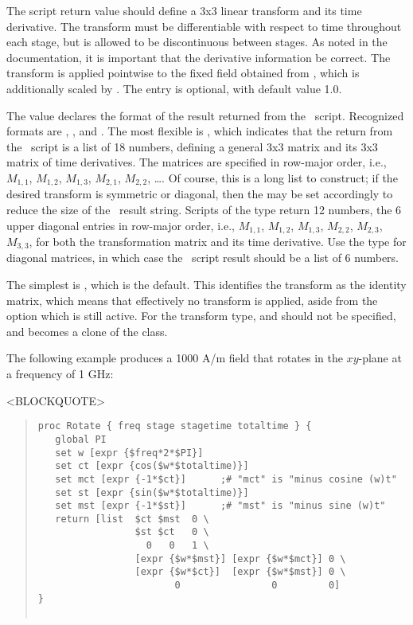 \begin{itemize}
\begin{description}
   The script return value should define a 3x3 linear transform and its
   time derivative.  The transform must be differentiable with respect
   to time throughout each stage, but is allowed to be discontinuous
   between stages.  As noted in the 
   documentation, it is important that the derivative information be
   correct.  The transform is applied pointwise to the fixed
   field obtained from , which is
   additionally scaled by .  The
    entry is optional, with default value 1.0.

   The   value declares the
   format of the result returned from the \Tcl\ script.  Recognized
   formats are , ,  and
   .  The most flexible is , which indicates
   that the return from the \Tcl\ script is a list of 18 numbers,
   defining a general 3x3 matrix and its 3x3 matrix of time derivatives.
   The matrices are specified in row-major order, i.e., $M_{1,1}$,
   $M_{1,2}$, $M_{1,3}$, $M_{2,1}$, $M_{2,2}$, \ldots.  Of course, this
   is a long list to construct; if the desired transform is symmetric or
   diagonal, then the  may be set accordingly to reduce the
   size of the \Tcl\ result string.  Scripts of the  type
   return 12 numbers, the 6 upper diagonal entries in row-major order,
   i.e., $M_{1,1}$, $M_{1,2}$, $M_{1,3}$, $M_{2,2}$, $M_{2,3}$,
   $M_{3,3}$, for both the transformation matrix and its time
   derivative.  Use the  type for diagonal matrices, in
   which case the \Tcl\ script result should be a list of 6 numbers.

   The simplest  is , which is the
   default.  This identifies the transform as the identity matrix, which
   means that effectively no transform is applied, aside from the
    option which is still active.  For the 
   transform type,  and  should not be
   specified, and  becomes a clone of the
    class.

   The following example produces a 1000 A/m field that rotates in the
   $xy$-plane at a frequency of 1 GHz:
\begin{rawhtml}<BLOCKQUOTE>\end{rawhtml}
\begin{quote}
\begin{verbatim}
proc Rotate { freq stage stagetime totaltime } {
   global PI
   set w [expr {$freq*2*$PI}]
   set ct [expr {cos($w*$totaltime)}]
   set mct [expr {-1*$ct}]      ;# "mct" is "minus cosine (w)t"
   set st [expr {sin($w*$totaltime)}]
   set mst [expr {-1*$st}]      ;# "mst" is "minus sine (w)t"
   return [list  $ct $mst  0 \
                 $st $ct   0 \
                   0   0   1 \
                 [expr {$w*$mst}] [expr {$w*$mct}] 0 \
                 [expr {$w*$ct}]  [expr {$w*$mst}] 0 \
                        0                0         0]
}


\end{verbatim}
\end{quote}
\end{description}
\end{itemize}
